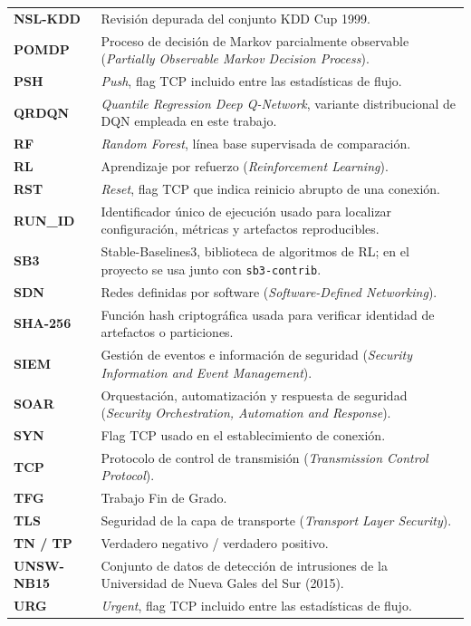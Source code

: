 \begin{longtable}{@{}p{2.6cm}p{10.8cm}@{}}
\textbf{NSL-KDD} & Revisión depurada del conjunto KDD Cup 1999. \\[2pt]
\textbf{POMDP} & Proceso de decisión de Markov parcialmente observable (\emph{Partially Observable Markov Decision Process}). \\[2pt]
\textbf{PSH} & \emph{Push}, flag TCP incluido entre las estadísticas de flujo. \\[2pt]
\textbf{QRDQN} & \emph{Quantile Regression Deep Q-Network}, variante distribucional de DQN empleada en este trabajo. \\[2pt]
\textbf{RF} & \emph{Random Forest}, línea base supervisada de comparación. \\[2pt]
\textbf{RL} & Aprendizaje por refuerzo (\emph{Reinforcement Learning}). \\[2pt]
\textbf{RST} & \emph{Reset}, flag TCP que indica reinicio abrupto de una conexión. \\[2pt]
\textbf{RUN\_ID} & Identificador único de ejecución usado para localizar configuración, métricas y artefactos reproducibles. \\[2pt]
\textbf{SB3} & Stable-Baselines3, biblioteca de algoritmos de RL; en el proyecto se usa junto con \texttt{sb3-contrib}. \\[2pt]
\textbf{SDN} & Redes definidas por software (\emph{Software-Defined Networking}). \\[2pt]
\textbf{SHA-256} & Función hash criptográfica usada para verificar identidad de artefactos o particiones. \\[2pt]
\textbf{SIEM} & Gestión de eventos e información de seguridad (\emph{Security Information and Event Management}). \\[2pt]
\textbf{SOAR} & Orquestación, automatización y respuesta de seguridad (\emph{Security Orchestration, Automation and Response}). \\[2pt]
\textbf{SYN} & Flag TCP usado en el establecimiento de conexión. \\[2pt]
\textbf{TCP} & Protocolo de control de transmisión (\emph{Transmission Control Protocol}). \\[2pt]
\textbf{TFG} & Trabajo Fin de Grado. \\[2pt]
\textbf{TLS} & Seguridad de la capa de transporte (\emph{Transport Layer Security}). \\[2pt]
\textbf{TN / TP} & Verdadero negativo / verdadero positivo. \\[2pt]
\textbf{UNSW-NB15} & Conjunto de datos de detección de intrusiones de la Universidad de Nueva Gales del Sur (2015). \\[2pt]
\textbf{URG} & \emph{Urgent}, flag TCP incluido entre las estadísticas de flujo. \\
\end{longtable}

